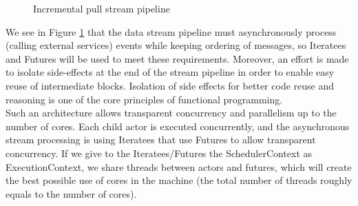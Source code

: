 \begin{figure}[h]
  \begin{center} 
    \caption{Incremental pull stream pipeline}
    \label{fig:datintflow}
  \end{center}
\end{figure}

We see in Figure \ref{fig:datintflow} that the data stream pipeline must asynchronously process (calling external services) events while keeping ordering of messages, so Iteratees and Futures will be used to meet these requirements.
Moreover, an effort is made to isolate side-effects at the end of the stream pipeline in order to enable easy reuse of intermediate blocks. Isolation of side effects for better code
reuse and reasoning is one of the core principles of functional programming.
\\

Such an architecture allows transparent concurrency and parallelism up to the number of cores. Each child actor is executed concurrently, and the asynchronous stream processing
is using Iteratees that use Futures to allow transparent concurrency. If we give to the Iteratees/Futures the SchedulerContext as ExecutionContext, we share threads between actors
and futures, which will create the best possible use of cores in the machine (the total number of threads roughly equals to the number of cores).

